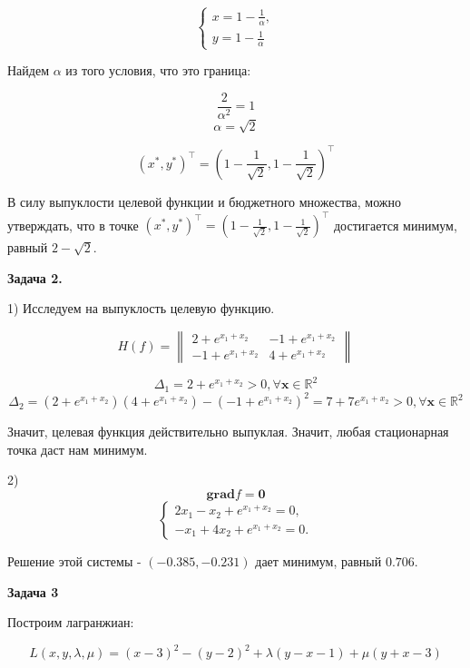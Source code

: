 \documentclass[12pt]{article}
\begin{document}
\begin{equation}
\begin{cases}
x= 1 - \frac{1}{\alpha},\\
y = 1 - \frac{1}{\alpha}
\end{cases}
\end{equation}
 
Найдем $\alpha$ из того условия, что это граница:

$$\frac{2}{\alpha^2}=1$$
$$\alpha = \sqrt{2}$$ 

$$(x^*, y^*)^\top = (1 - \frac{1}{\sqrt{2}}, 1 - \frac{1}{\sqrt{2}})^\top$$

В силу выпуклости целевой функции и бюджетного множества, можно утверждать, что в точке $(x^*, y^*)^\top = (1 - \frac{1}{\sqrt{2}}, 1 - \frac{1}{\sqrt{2}})^\top$ достигается минимум, равный $2 -\sqrt{2}$.

\begin{center}
	\textbf{Задача 2.}
\end{center}

1) Исследуем на выпуклость целевую функцию.

$$H(f) = \begin{Vmatrix}
2 + e^{x_1+x_2} & -1 + e^{x_1+x_2}\\
-1 + e^{x_1+x_2} & 4 + e^{x_1+x_2}
\end{Vmatrix}
$$

$$\Delta_1 = 2 + e^{x_1+x_2} > 0, \forall \textbf{x}\in\mathbb{R}^2$$
$$\Delta_2 = (2 + e^{x_1+x_2})(4 + e^{x_1+x_2}) - (-1 + e^{x_1+x_2})^2 = 7 +7e^{x_1+x_2} > 0, \forall \textbf{x}\in\mathbb{R}^2$$

Значит, целевая функция действительно выпуклая. Значит, любая стационарная точка даст нам минимум.

2) $$\textbf{grad}f = \textbf{0}$$
\begin{equation}
\begin{cases}
2x_1 - x_2 + e^{x_1+x_2} = 0,\\
-x_1 + 4x_2 + e^{x_1+x_2} = 0.
\end{cases}
\end{equation}

Решение этой системы - $(-0.385, -0.231)$ дает минимум, равный $0.706$.

\begin{center}
	\textbf{Задача 3}
\end{center}

Построим лагранжиан:

$$L(x,y,\lambda,\mu) = (x-3)^2 - (y-2)^2 + \lambda(y-x-1)+\mu(y+x-3)$$
\end{document}
